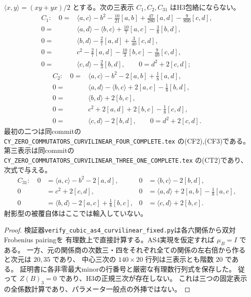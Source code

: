 \begin{theorem}[非被約基点の三つの固定表示の排除]
\label{thm:as4-curvilinear4-h3-exclusion}
$\langle x,y\rangle=(xy+yx)/2$ とする。次の三表示 $C_1,C_2,C_{31}$ はH3包絡にならない。
\[
\begin{aligned}
C_1:\quad0={}&\langle a,c\rangle-b^2-\tfrac{10}{21}[a,b]
 +\tfrac{47}{280}[a,d]-\tfrac9{800}[c,d],\\
0={}&\langle a,d\rangle-\langle b,c\rangle+\tfrac{10}{7}[a,c]-\tfrac38[b,d],\\
0={}&\langle b,d\rangle-\tfrac27[a,d]+\tfrac3{40}[c,d],\\
0={}&c^2-\tfrac27[a,d]-\tfrac{10}{3}[b,c]-\tfrac9{40}[c,d],\\
0={}&\langle c,d\rangle-\tfrac23[b,d],\qquad0=d^2+2[c,d];
\end{aligned}
\]
\[
\begin{aligned}
C_2:\quad0={}&\langle a,c\rangle-b^2-2[a,b]+\tfrac18[a,d],\\
0={}&\langle a,d\rangle-\langle b,c\rangle+2[a,c]-\tfrac18[b,d],\\
0={}&\langle b,d\rangle+2[b,c],\\
0={}&c^2+2[a,d]+2[b,c]-\tfrac18[c,d],\\
0={}&\langle c,d\rangle-2[b,d],\qquad0=d^2+2[c,d].
\end{aligned}
\]
最初の二つは同commitの {\small\texttt{CY\_ZERO\_COMMUTATORS\_CURVILINEAR\_FOUR\_COMPLETE.tex}}
の(CF2),(CF3)である。第三表示は同commitの {\small\texttt{CY\_ZERO\_COMMUTATORS\_CURVILINEAR\_THREE\_ONE\_COMPLETE.tex}}
の(CT2)であり、次式で与える。
\[
\begin{aligned}
C_{31}:\quad0&=\langle a,c\rangle-b^2-2[a,d],&
0&=\langle b,c\rangle-2[b,d],\\
0&=c^2+2[c,d],&
0&=\langle a,d\rangle+2[a,b]-\tfrac18[a,c],\\
0&=\langle b,d\rangle-2[a,c]+\tfrac18[b,c],&
0&=\langle c,d\rangle+2[b,c].
\end{aligned}
\]
射影型の被覆自体はここでは輸入していない。
\end{theorem}
\begin{proof}
検証器\texttt{verify\_cubic\_as4\_curvilinear\_fixed.py}は各六関係から双対Frobenius pairingを
有理数上で直接計算する。AS4実現を仮定すれば $\mu_B=I$ である。
一方、元の関係商の次数三・四をそれぞれ全ての関係の左右倍から作ると次元は $20,35$ であり、
中心三次の $140\times20$ 行列は三表示とも階数 $20$ である。
証明書に各非零最大minorの行番号と厳密な有理数行列式を保存した。
従って $Z(B)_3=0$ であり、H3の正規三次が存在しない。
これは三つの固定表示の全係数計算であり、パラメータ一般点の外挿ではない。
\end{proof}
